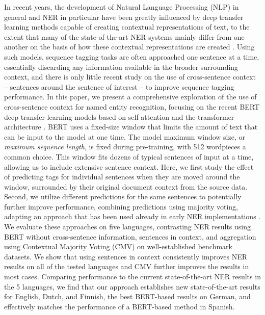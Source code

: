 \documentclass[11pt]{article}
\begin{document}
In recent years, the development of Natural Language Processing (NLP) in general and NER in particular have been greatly influenced by deep transfer learning methods capable of creating contextual representations of text, to the extent that many of the state-of-the-art NER systems mainly differ from one another on the basis of how these contextual representations are created \cite{Peters_2018,devlin2018bert,akbik2018coling,Baevski_2019}. Using such models, sequence tagging tasks are often approached one sentence at a time, essentially discarding any information available in the broader surrounding context, and there is only little recent study on the use of cross-sentence context -- sentences around the sentence of interest -- to improve sequence tagging performance. In this paper, we present a comprehensive exploration of the use of cross-sentence context for named entity recognition, focusing on the recent BERT deep transfer learning models \cite{devlin2018bert} based on self-attention and the transformer architecture \cite{vaswani2017attention}. BERT uses a fixed-size window that limits the amount of text that can be input to the model at one time. The model maximum window size, or \emph{maximum sequence length}, is fixed during pre-training, with 512 wordpieces a common choice. This window fits dozens of typical sentences of input at a time, allowing us to include extensive sentence context. Here, we first study the effect of predicting tags for individual sentences when they are moved around the window, surrounded by their original document context from the source data. Second, we utilize different predictions for the same sentences to potentially further improve performance, combining predictions using majority voting, adapting an approach that has been used already in early NER implementations \cite{tjong-kim-sang-etal-2000-applying,van-halteren-etal-2001-improving,florian-etal-2003-named}.
We evaluate these approaches on five languages, contrasting NER results using BERT without cross-sentence information, sentences in context, and aggregation using Contextual Majority Voting (CMV) on well-established benchmark datasets.
We show that using sentences in context consistently improves NER results on all of the tested languages and CMV further improves the results in most cases. Comparing performance to the current state-of-the-art NER results in the 5 languages, we find that our approach establishes new state-of-the-art results for English, Dutch, and Finnish, the best BERT-based results on German, and effectively matches the performance of a BERT-based method in Spanish. 
\end{document}
